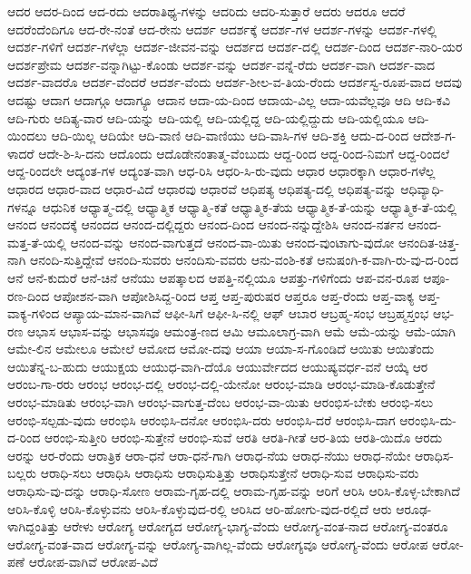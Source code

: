 {ಆದರ
ಆದರ-ದಿಂದ
ಆದ-ರದು
ಆದರಾತಿಥ್ಯ-ಗಳನ್ನು
ಆದರಿದು
ಆದರಿ-ಸುತ್ತಾರೆ
ಆದರು
ಆದರೂ
ಆದರೆ
ಆದರೆಂದೆಂದಿಗೂ
ಆದ-ರೇ-ನಂತೆ
ಆದ-ರೇನು
ಆದರ್ಶ
ಆದರ್ಶಕ್ಕೆ
ಆದರ್ಶ-ಗಳ
ಆದರ್ಶ-ಗಳನ್ನು
ಆದರ್ಶ-ಗಳಲ್ಲಿ
ಆದರ್ಶ-ಗಳಿಗೆ
ಆದರ್ಶ-ಗಳೆಲ್ಲಾ
ಆದರ್ಶ-ಜೀವನ-ವನ್ನು
ಆದರ್ಶದ
ಆದರ್ಶ-ದಲ್ಲಿ
ಆದರ್ಶ-ದಿಂದ
ಆದರ್ಶ-ನಾರಿ-ಯರ
ಆದರ್ಶಪ್ರೇಮ
ಆದರ್ಶ-ವನ್ನಾಗಿಟ್ಟು-ಕೊಂಡು
ಆದರ್ಶ-ವನ್ನು
ಆದರ್ಶ-ವನ್ನೆ-ರೆದು
ಆದರ್ಶ-ವಾಗಿ
ಆದರ್ಶ-ವಾದ
ಆದರ್ಶ-ವಾದರೊ
ಆದರ್ಶ-ವೆಂದರೆ
ಆದರ್ಶ-ವೆಂದು
ಆದರ್ಶ-ಶೀಲ-ವ-ತಿಯ-ರೆಂದು
ಆದರ್ಶಸ್ವ-ರೂಪ-ವಾದ
ಆದವು
ಆದಷ್ಟು
ಆದಾಗ
ಆದಾಗ್ಗೂ
ಆದಾಗ್ಯೂ
ಆದಾನ
ಆದಾ-ಯ-ದಿಂದ
ಆದಾಯ-ವಿಲ್ಲ
ಆದಾ-ಯವೆಲ್ಲವೂ
ಆದಿ
ಆದಿ-ಕವಿ
ಆದಿ-ಗುರು
ಆದಿತ್ಯ-ವಾರ
ಆದಿ-ಯನ್ನು
ಆದಿ-ಯಲ್ಲಿ
ಆದಿ-ಯಲ್ಲಿದ್ದ
ಆದಿ-ಯಲ್ಲಿದ್ದುದು
ಆದಿ-ಯಲ್ಲಿಯೂ
ಆದಿ-ಯಿಂದಲು
ಆದಿ-ಯಿಲ್ಲ
ಆದಿಯೇ
ಆದಿ-ವಾಣಿ
ಆದಿ-ವಾಣಿಯು
ಆದಿ-ವಾಸಿ-ಗಳ
ಆದಿ-ಶಕ್ತಿ
ಆದು-ದ-ರಿಂದ
ಆದೇಶ-ಗ-ಳಾದರೆ
ಆದೇ-ಶಿ-ಸಿ-ದನು
ಆದೊಂದು
ಆದೊಡೇನಂತಾತ್ಮ-ವೆಂಬುದು
ಆದ್ದ-ರಿಂದ
ಆದ್ದ-ರಿಂದ-ನಿಮಗೆ
ಆದ್ದ-ರಿಂದಲೆ
ಆದ್ದ-ರಿಂದಲೇ
ಆದ್ಯಂತ-ಗಳ
ಆದ್ಯಂತ-ವಾಗಿ
ಆಧ-ರಿಸಿ
ಆಧರಿ-ಸಿ-ರು-ವುದು
ಆಧಾರ
ಆಧಾರಕ್ಕಾಗಿ
ಆಧಾರ-ಗಳೆಲ್ಲ
ಆಧಾರದ
ಆಧಾರ-ವಾದ
ಆಧಾರ-ವಿದೆ
ಆಧಾರವು
ಆಧಾರವೆ
ಆಧಿಪತ್ಯ
ಆಧಿಪತ್ಯ-ದಲ್ಲಿ
ಆಧಿಪತ್ಯ-ವನ್ನು
ಆಧಿವ್ಯಾಧಿ-ಗಳನ್ನೂ
ಆಧುನಿಕ
ಆಧ್ಯಾತ್ಮ-ದಲ್ಲಿ
ಆಧ್ಯಾತ್ಮಿಕ
ಆಧ್ಯಾತ್ಮಿ-ಕತೆ
ಆಧ್ಯಾತ್ಮಿಕ-ತೆಯ
ಆಧ್ಯಾತ್ಮಿಕ-ತೆ-ಯನ್ನು
ಆಧ್ಯಾತ್ಮಿಕ-ತೆ-ಯಲ್ಲಿ
ಆನಂದ
ಆನಂದಕ್ಕೆ
ಆನಂದದ
ಆನಂದ-ದಲ್ಲಿದ್ದರು
ಆನಂದ-ದಿಂದ
ಆನಂದ-ನನ್ನುದ್ದೇಶಿಸಿ
ಆನಂದ-ನರ್ತನ
ಆನಂದ-ಮತ್ತ-ತೆ-ಯಲ್ಲಿ
ಆನಂದ-ವನ್ನು
ಆನಂದ-ವಾಗುತ್ತದೆ
ಆನಂದ-ವಾ-ಯಿತು
ಆನಂದ-ವುಂಟಾಗು-ವುದೋ
ಆನಂದಿತ-ಚಿತ್ತ-ನಾಗಿ
ಆನಂದಿ-ಸುತ್ತಿದ್ದೇವೆ
ಆನಂದಿ-ಸುವರು
ಆನಂದಿಸು-ವವರು
ಆನು-ವಂಶಿ-ಕತೆ
ಆನುಷಂಗಿ-ಕ-ವಾಗಿ-ರು-ವು-ದ-ರಿಂದ
ಆನೆ
ಆನೆ-ಕುದುರೆ
ಆನೆ-ಚಿನೆ
ಆನೆಯು
ಆಪತ್ಕಾಲದ
ಆಪತ್ತಿ-ನಲ್ಲಿಯೂ
ಆಪತ್ತು-ಗಳಿಗೆಂದು
ಆಪ-ವನ-ರೂಪ
ಆಪೂ-ರಣ-ದಿಂದ
ಆಪೋಶನ-ವಾಗಿ
ಆಪೋಶಿಸಿದ್ದ-ರಿಂದ
ಆಪ್ತ
ಆಪ್ತ-ಪುರುಷರ
ಆಪ್ತರೂ
ಆಪ್ತ-ರೆಂದು
ಆಪ್ತ-ವಾಕ್ಯ
ಆಪ್ತ-ವಾಕ್ಯ-ಗಳಿಂದ
ಆಪ್ಯಾಯ-ಮಾನ-ವಾಗಿವೆ
ಆಫೀ-ಸಿಗೆ
ಆಫೀ-ಸಿ-ನಲ್ಲಿ
ಆಫ್
ಆಬಾರ
ಆಬ್ರಹ್ಮ-ಸಂಭ
ಆಬ್ರಹ್ಮಸ್ತಂಭ
ಆಭ-ರಣ
ಆಭಾಸ
ಆಭಾಸ-ವನ್ನು
ಆಭಾಸವೂ
ಆಮಂತ್ರ-ಣದ
ಆಮಿ
ಆಮೂಲಾಗ್ರ-ವಾಗಿ
ಆಮೆ
ಆಮೆ-ಯನ್ನು
ಆಮೆ-ಯಾಗಿ
ಆಮೇ-ಲಿನ
ಆಮೇಲೂ
ಆಮೇಲೆ
ಆಮೋದ
ಆಮೋ-ದವು
ಆಯಾ
ಆಯಾ-ಸ-ಗೊಂಡಿದೆ
ಆಯಿತು
ಆಯಿತೆಂದು
ಆಯಿತೆನ್ನ-ಬ-ಹುದು
ಆಯುಕ್ಷಯ
ಆಯುಧ-ವಾಗಿ-ದೆಯೊ
ಆಯುರ್ವೇದದ
ಆಯುಷ್ಯವರ್ಧ-ವನೆ
ಆಯ್ಕೆ
ಆರ
ಆರಂಬ-ಗಾ-ರರು
ಆರಂಭ
ಆರಂಭ-ದಲ್ಲಿ
ಆರಂಭ-ದಲ್ಲಿ-ಯೇನೋ
ಆರಂಭ-ಮಾಡಿ
ಆರಂಭ-ಮಾಡಿ-ಕೊಡುತ್ತೇನೆ
ಆರಂಭ-ಮಾಡಿತು
ಆರಂಭ-ವಾಗಿ
ಆರಂಭ-ವಾಗುತ್ತ-ದೆಂಬ
ಆರಂಭ-ವಾ-ಯಿತು
ಆರಂಭಿಸ-ಬೇಕು
ಆರಂಭಿ-ಸಲು
ಆರಂಭಿ-ಸಲ್ಪಡು-ವುದು
ಆರಂಭಿಸಿ
ಆರಂಭಿಸಿ-ದನೋ
ಆರಂಭಿಸಿ-ದರು
ಆರಂಭಿಸಿ-ದರೆ
ಆರಂಭಿಸಿ-ದಾಗ
ಆರಂಭಿಸಿ-ದು-ದ-ರಿಂದ
ಆರಂಭಿ-ಸುತ್ತೀರಿ
ಆರಂಭಿ-ಸುತ್ತೇನೆ
ಆರಂಭಿ-ಸುವೆ
ಆರತಿ
ಆರತಿ-ಗೀತೆ
ಆರ-ತಿಯ
ಆರತಿ-ಯಿದೊ
ಆರದು
ಆರನ್ನು
ಆರ-ರೆಂದು
ಆರಾತ್ರಿಕ
ಆರಾ-ಧನೆ
ಆರಾ-ಧನೆ-ಗಾಗಿ
ಆರಾಧ-ನೆಯ
ಆರಾಧ-ನೆಯು
ಆರಾಧ-ನೆಯೇ
ಆರಾಧಿಸ-ಬಲ್ಲರು
ಆರಾಧಿ-ಸಲು
ಆರಾಧಿಸಿ
ಆರಾಧಿಸು
ಆರಾಧಿಸುತ್ತಿತ್ತು
ಆರಾಧಿಸುತ್ತೇನೆ
ಆರಾಧಿ-ಸುವ
ಆರಾಧಿಸು-ವರು
ಆರಾಧಿಸು-ವು-ದನ್ನು
ಆರಾಧಿ-ಸೋಣ
ಆರಾಮ-ಗೃಹ-ದಲ್ಲಿ
ಆರಾಮ-ಗೃಹ-ವನ್ನು
ಆರಿಗೆ
ಆರಿಸಿ
ಆರಿಸಿ-ಕೊಳ್ಳ-ಬೇಕಾಗಿದೆ
ಆರಿಸಿ-ಕೊಳ್ಳಿ
ಆರಿಸಿ-ಕೊಳ್ಳುವನು
ಆರಿಸಿ-ಕೊಳ್ಳುವುದ-ರಲ್ಲಿ
ಆರಿಸಿದ
ಆರಿ-ಹೋಗು-ವುದ-ರಲ್ಲಿದೆ
ಆರು
ಆರೂಢ-ಳಾಗಿದ್ದಂತಿತ್ತು
ಆರೇಳು
ಆರೋಗ್ಯ
ಆರೋಗ್ಯದ
ಆರೋಗ್ಯ-ಭಾಗ್ಯ-ವೆಂದು
ಆರೋಗ್ಯ-ವಂತ-ನಾದ
ಆರೋಗ್ಯ-ವಂತರೂ
ಆರೋಗ್ಯ-ವಂತ-ವಾದ
ಆರೋಗ್ಯ-ವನ್ನು
ಆರೋಗ್ಯ-ವಾಗಿಲ್ಲ-ವೆಂದು
ಆರೋಗ್ಯವೂ
ಆರೋಗ್ಯ-ವೆಂದು
ಆರೋಪ
ಆರೋ-ಪಣೆ
ಆರೋಪ-ವಾಗಿವೆ
ಆರೋಪ-ವಿದೆ
}
